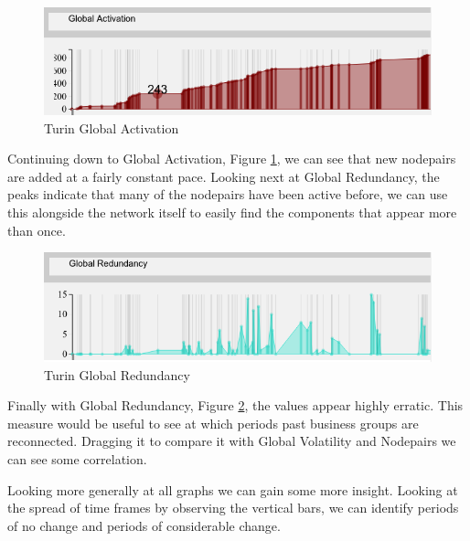 \begin{figure}[h!]
  \begin{center}
  \includegraphics[trim={0 0 0 0}, width=140mm]{./Figures/TurinGlobalActivation.png}
  \caption{Turin Global Activation}
  \label{fig:TurinGlobalActivation}
  \end{center}
\end{figure}

Continuing down to Global Activation, Figure \ref{fig:TurinGlobalActivation}, we can see that new nodepairs are added at a fairly constant pace. Looking next at Global Redundancy, the peaks indicate that many of the nodepairs have been active before, we can use this alongside the network itself to easily find the components that appear more than once.

\begin{figure}[h!]
  \begin{center}
  \includegraphics[trim={0 0 0 0}, width=140mm]{./Figures/TurinGlobalRedundancy.png}
  \caption{Turin Global Redundancy}
  \label{fig:TurinGlobalRedundancy}
  \end{center}
\end{figure}
Finally with Global Redundancy, Figure \ref{fig:TurinGlobalRedundancy}, the values appear highly erratic. This measure would be useful to see at which periods past business groups are reconnected. Dragging it to compare it with Global Volatility and Nodepairs we can see some correlation.


Looking more generally at all graphs we can gain some more insight. Looking at the spread of time frames by observing the vertical bars, we can identify periods of no change and periods of considerable change. 
    
\begin{center}
\end{center}

